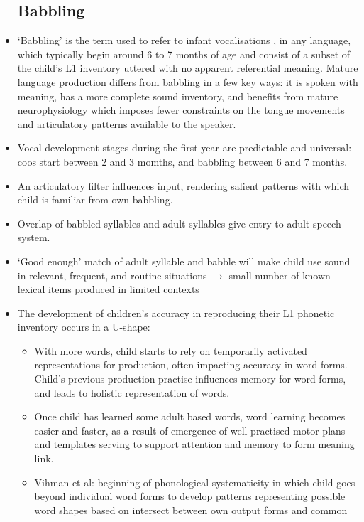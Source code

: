 \documentclass{article}
\begin{document}
\begin{itemize}
    \subsection{Babbling}
    \item ‘Babbling’ is the term used to refer to infant vocalisations , in any language, which typically begin around 6 to 7 months of age and consist of a subset of the child’s L1 inventory uttered with no apparent referential meaning. Mature language production differs from babbling in a few key ways: it is spoken with meaning, has a more complete sound inventory, and benefits from mature neurophysiology which imposes fewer constraints on the tongue movements and articulatory patterns available to the speaker. 
    \item Vocal development stages during the first year are predictable and universal: coos start between 2 and 3 momths, and babbling between 6 and 7 months.
    \item An articulatory filter influences input, rendering salient patterns with
    which child is familiar from own babbling.
    \item Overlap of babbled syllables and adult syllables give entry to adult
    speech system.
    \item ‘Good enough’ match of adult syllable and babble will make child use
    sound in relevant, frequent, and routine situations $\rightarrow$ small number of
    known lexical items produced in limited contexts
    \item The development of children's accuracy in reproducing their L1 phonetic inventory occurs in a U-shape:
    \begin{itemize}
        \item With more words, child starts to rely on temporarily activated
        representations for production, often impacting accuracy in word
        forms. Child’s previous production practise influences memory for
        word forms, and leads to holistic representation of words.
        \item Once child has learned some adult based words, word learning becomes easier and faster, as a result of emergence of well practised motor plans and templates serving to support attention and memory to form meaning link.
        \item Vihman et al: beginning of phonological systematicity in which child goes
        beyond individual word forms to develop patterns representing possible
        word shapes based on intersect between own output forms and common

\end{itemize}
\end{itemize}
\end{document}
